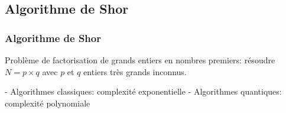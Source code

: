 \documentclass{beamer}
\begin{document}
\begin{frame}
\begin{columns}
\end{columns}

\end{frame}

\subsection{Algorithme de Shor}

\begin{frame}
\frametitle{Algorithme de Shor \cite{Shor97}}

Problème de factorisation de grands entiers en nombres premiers: résoudre $N = p \times q$ avec $p$ et $q$ entiers très grands inconnus. 

\medbreak

- Algorithmes classiques: complexité exponentielle
\medbreak
- Algorithmes quantiques: complexité polynomiale




\end{frame}
\end{document}
